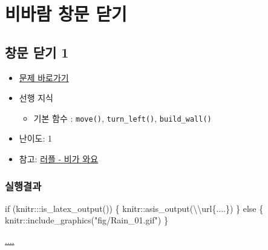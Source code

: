 \documentclass[
  b5paperpaper,
  DIV=11,
  numbers=noendperiod]{scrreprt}
\newenvironment{Shaded}{\begin{snugshade}}{\end{snugshade}}
\newcommand{\ControlFlowTok}[1]{\textcolor[rgb]{0.00,0.23,0.31}{#1}}
\newcommand{\FunctionTok}[1]{\textcolor[rgb]{0.28,0.35,0.67}{#1}}
\newcommand{\NormalTok}[1]{\textcolor[rgb]{0.00,0.23,0.31}{#1}}
\newcommand{\SpecialCharTok}[1]{\textcolor[rgb]{0.37,0.37,0.37}{#1}}
\newcommand{\StringTok}[1]{\textcolor[rgb]{0.13,0.47,0.30}{#1}}
\providecommand{\tightlist}{%
  \setlength{\itemsep}{0pt}\setlength{\parskip}{0pt}}\usepackage{longtable,booktabs,array}
\begin{document}
\hypertarget{rains}{%
\chapter{비바람 창문 닫기}\label{rains}}

\hypertarget{rain-01}{%
\section{창문 닫기 1}\label{rain-01}}

\begin{itemize}
\tightlist
\item
  \href{https://reeborg.ca/reeborg.html?lang=ko-en\&mode=python\&menu=worlds\%2Fmenus\%2Freeborg_intro_en.json\&name=Rain\%200\&url=worlds\%2Ftutorial_en\%2Frain0.json}{문제
  바로가기}
\item
  선행 지식

  \begin{itemize}
  \tightlist
  \item
    기본 함수 : \texttt{move()}, \texttt{turn\_left()},
    \texttt{build\_wall()}
  \end{itemize}
\item
  난이도: 1
\item
  참고: \href{http://statkclee.github.io/rur-ple/intro/22-rain.htm}{러플
  - 비가 와요}
\end{itemize}

\hypertarget{uxc2e4uxd589uxacb0uxacfc-20}{%
\subsection{실행결과}\label{uxc2e4uxd589uxacb0uxacfc-20}}

\begin{Shaded}
\begin{Highlighting}[]
\ControlFlowTok{if}\NormalTok{ (knitr}\SpecialCharTok{:::}\FunctionTok{is\_latex\_output}\NormalTok{()) \{}
\NormalTok{  knitr}\SpecialCharTok{::}\FunctionTok{asis\_output}\NormalTok{(}\StringTok{\textquotesingle{}}\SpecialCharTok{\textbackslash{}\textbackslash{}}\StringTok{url\{....\}\textquotesingle{}}\NormalTok{)}
\NormalTok{\} }\ControlFlowTok{else}\NormalTok{ \{}
\NormalTok{  knitr}\SpecialCharTok{::}\FunctionTok{include\_graphics}\NormalTok{(}\StringTok{"fig/Rain\_01.gif"}\NormalTok{)}
\NormalTok{\}}
\end{Highlighting}
\end{Shaded}

\url{....}
\end{document}
